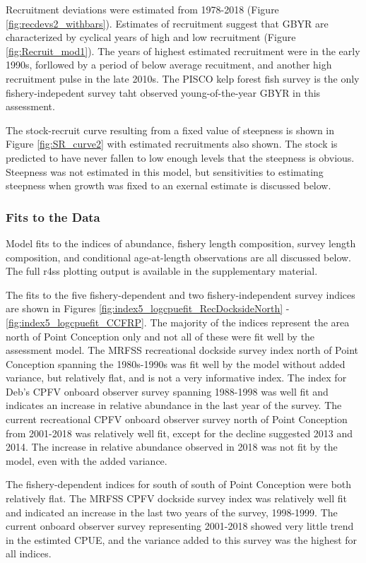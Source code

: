 \documentclass[12pt,]{article}
\begin{document}
Recruitment deviations were estimated from 1978-2018 (Figure
\ref{fig:recdevs2_withbars}). Estimates of recruitment suggest that GBYR
are characterized by cyclical years of high and low recruitment (Figure
\ref{fig:Recruit_mod1}). The years of highest estimated recruitment were
in the early 1990s, forllowed by a period of below average recuitment,
and another high recruitment pulse in the late 2010s. The PISCO kelp
forest fish survey is the only fishery-indepedent survey taht observed
young-of-the-year GBYR in this assessment.

The stock-recruit curve resulting from a fixed value of steepness is
shown in Figure \ref{fig:SR_curve2} with estimated recruitments also
shown. The stock is predicted to have never fallen to low enough levels
that the steepness is obvious. Steepness was not estimated in this
model, but sensitivities to estimating steepness when growth was fixed
to an exernal estimate is discussed below.

\subsubsection{Fits to the Data}\label{fits-to-the-data}

Model fits to the indices of abundance, fishery length composition,
survey length composition, and conditional age-at-length observations
are all discussed below. The full r4ss plotting output is available in
the supplementary material.

The fits to the five fishery-dependent and two fishery-independent
survey indices are shown in Figures
\ref{fig:index5_logcpuefit_RecDocksideNorth} -
\ref{fig:index5_logcpuefit_CCFRP}. The majority of the indices represent
the area north of Point Conception only and not all of these were fit
well by the assessment model. The MRFSS recreational dockside survey
index north of Point Conception spanning the 1980s-1990s was fit well by
the model without added variance, but relatively flat, and is not a very
informative index. The index for Deb's CPFV onboard observer survey
spanning 1988-1998 was well fit and indicates an increase in relative
abundance in the last year of the survey. The current recreational CPFV
onboard observer survey north of Point Conception from 2001-2018 was
relatively well fit, except for the decline suggested 2013 and 2014. The
increase in relative abundance observed in 2018 was not fit by the
model, even with the added variance.

The fishery-dependent indices for south of south of Point Conception
were both relatively flat. The MRFSS CPFV dockside survey index was
relatively well fit and indicated an increase in the last two years of
the survey, 1998-1999. The current onboard observer survey representing
2001-2018 showed very little trend in the estimted CPUE, and the
variance added to this survey was the highest for all indices.
\end{document}
